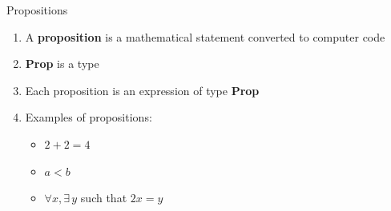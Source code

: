 \documentclass[xcolor=dvipsnames]{beamer}
\begin{document}
\begin{frame}{Propositions}


\begin{enumerate}
    \item A \textbf{proposition} is a mathematical statement converted to computer code
    \item \textbf{Prop} is a type
    \item Each proposition is an expression of type \textbf{Prop}
    \item Examples of propositions:
    \begin{itemize}
        \item $2 +2=4$
        \item $a < b$
        \item $\forall x, \exists \, y $ such that $2x = y$
    \end{itemize}



\end{enumerate}

\end{frame}




    







    


\end{document}
